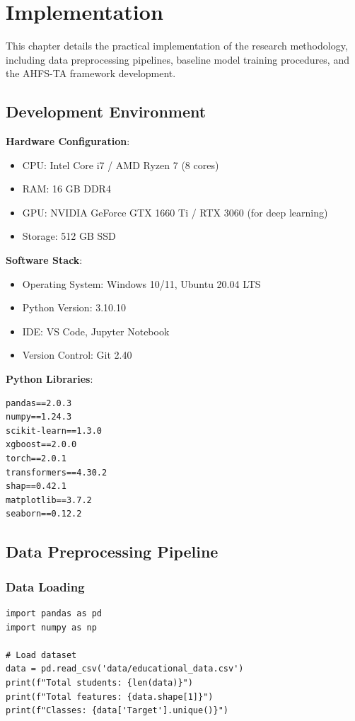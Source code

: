 \chapter{Implementation}

This chapter details the practical implementation of the research methodology, including data preprocessing pipelines, baseline model training procedures, and the AHFS-TA framework development.

\section{Development Environment}

\textbf{Hardware Configuration}:
\begin{itemize}
\item CPU: Intel Core i7 / AMD Ryzen 7 (8 cores)
\item RAM: 16 GB DDR4
\item GPU: NVIDIA GeForce GTX 1660 Ti / RTX 3060 (for deep learning)
\item Storage: 512 GB SSD
\end{itemize}

\textbf{Software Stack}:
\begin{itemize}
\item Operating System: Windows 10/11, Ubuntu 20.04 LTS
\item Python Version: 3.10.10
\item IDE: VS Code, Jupyter Notebook
\item Version Control: Git 2.40
\end{itemize}

\textbf{Python Libraries}:
\begin{verbatim}
pandas==2.0.3
numpy==1.24.3
scikit-learn==1.3.0
xgboost==2.0.0
torch==2.0.1
transformers==4.30.2
shap==0.42.1
matplotlib==3.7.2
seaborn==0.12.2
\end{verbatim}

\section{Data Preprocessing Pipeline}

\subsection{Data Loading}

\begin{verbatim}
import pandas as pd
import numpy as np

# Load dataset
data = pd.read_csv('data/educational_data.csv')
print(f"Total students: {len(data)}")
print(f"Total features: {data.shape[1]}")
print(f"Classes: {data['Target'].unique()}")
\end{verbatim}

